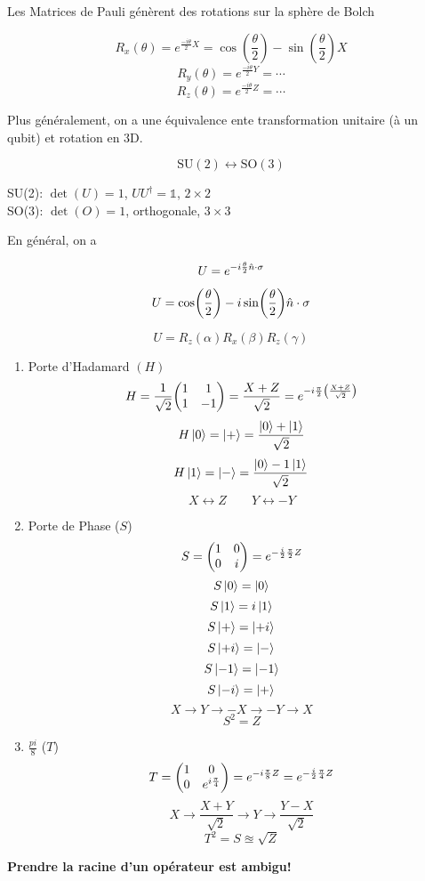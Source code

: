 Les Matrices de Pauli génèrent des rotations sur la sphère de Bolch

$$R_{x}(\theta) = e^{\frac{-i\theta}{2}X } = \cos(\frac{\theta}{2} ) - \sin(\frac{\theta}{2} )X$$ 
$$R_y (\theta) = e^{\frac{-i\theta}{2}Y} = \dotsb$$ 
$$R_z (\theta) = e^{\frac{-i\theta}{2}Z} = \dotsb$$ 


Plus généralement, on a une équivalence ente transformation unitaire (à un qubit) et rotation en 3D.


$$\text{SU} (2)\longleftrightarrow \text{SO} (3)$$ 


SU(2): $\det(U) =1$, $UU^\dagger=\mathds{1}$, $2 \times 2$   \\

SO(3): $\det(O)= 1$, orthogonale, $3 \times 3$   

En général, on a 

$$U = e^{-i \frac{\theta}{2} \hat n \cdot \vb{}{\sigma}}$$ 

$$U = \cos(\frac{\theta}{2} )-i\sin(\frac{\theta}{2} ) \hat n \cdot \vb\sigma$$ 

$$U = R_z (\alpha) R_x (\beta) R_z (\gamma)$$


\begin{tcolorbox}[title=3 opérations utiles]
	 \begin{enumerate}
	 	\item Porte d'Hadamard $(H)$ 
			$$H = \frac{1}{\sqrt{2}} \mqty(1 & 1\\ 1 &-1) = \frac{X+Z}{\sqrt{2}} = e^{-i \frac{\pi}{2} \left( \frac{X+Z}{\sqrt{2}}  \right) }$$ 
			$$H  \ket{0} = \ket{+} = \frac{\ket{0}+\ket{1}}{\sqrt{2} }$$ 
			$$H \ket{1} = \ket{-} = \frac{\ket{0}-1\ket{1}}{\sqrt{2}} $$ 
		$$X \leftrightarrow Z \qquad Y \leftrightarrow -Y$$  
	\item Porte de Phase ($S$)
			$$S = \mqty(1 & 0 \\ 0 & i)= e^{- \frac{i}{2} \frac{\pi}{2} Z}$$ 
			$$S\ket{0}=\ket{0}$$ 
			$$S\ket{1}=i\ket{1}$$ 
			$$S\ket{+}=\ket{+i}$$ 
			$$S\ket{+i}=\ket{-}$$ 
			$$S\ket{-1}=\ket{-1}$$ 
			$$S\ket{-i}=\ket{+}$$ 
			$$X\to Y\to -X \to -Y \to X$$ 
			$$S^2=Z$$ 
\item $\frac{pi}{8} $ ($T$)
			$$T = \mqty(1 & 0 \\ 0 & e^{i\frac{\pi}{4} }) = e^{-i \frac{\pi}{8} Z} =e^{- \frac{i}{2} \frac{\pi}{4} Z}$$ 
			$$X\to \frac{X+Y}{\sqrt{2}} \to Y \to \frac{Y-X}{\sqrt{2}} $$ 
			$$T^2=S \approxeq \sqrt{Z}$$ 
	 \end{enumerate}

{\bf\centering Prendre la racine d'un opérateur est ambigu!}

\end{tcolorbox}

